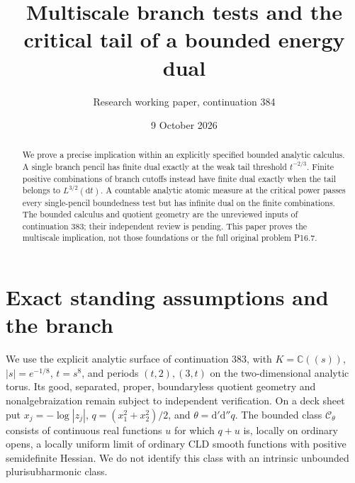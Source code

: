 \documentclass[11pt]{article}
\title{Multiscale branch tests and the critical tail of a bounded energy dual}
\author{Research working paper, continuation 384}
\date{9 October 2026}
\newcommand{\DD}{\mathrm d'\mathrm d''}
\newcommand{\C}{\mathcal C_\theta}
\begin{document}
\maketitle
\begin{abstract}
We prove a precise implication within an explicitly specified bounded analytic
calculus. A single branch pencil has finite dual exactly at the weak tail
threshold $t^{-2/3}$. Finite positive combinations of branch cutoffs instead
have finite dual exactly when the tail belongs to $L^{3/2}(\mathrm dt)$.
A countable analytic atomic measure at the critical power passes every
single-pencil boundedness test but has infinite dual on the finite combinations.
The bounded calculus and quotient geometry are the unreviewed inputs of
continuation 383; their independent review is pending. This paper proves the
multiscale implication, not those foundations or the full original problem P16.7.
\end{abstract}

\section{Exact standing assumptions and the branch}
We use the explicit analytic surface of continuation 383, with
$K=\mathbb C((s))$, $|s|=e^{-1/8}$, $t=s^8$, and periods
$(t,2),(3,t)$ on the two-dimensional analytic torus. Its good, separated,
proper, boundaryless quotient geometry and nonalgebraization remain subject
to independent verification. On a deck sheet put $x_j=-\log|z_j|$,
$q=(x_1^2+x_2^2)/2$, and $\theta=\DD q$.
The bounded class $\C$ consists of continuous real functions $u$ for which
$q+u$ is, locally on ordinary opens, a locally uniform limit of ordinary
CLD smooth functions with positive semidefinite Hessian. We do not identify
this class with an intrinsic unbounded plurisubharmonic class.
\end{document}
